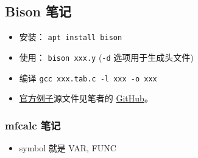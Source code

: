 \subsection{Bison 笔记}
\begin{itemize}
\item 安装： \verb`apt install bison`
\item 使用： \verb`bison xxx.y` (\verb`-d` 选项用于生成头文件)
\item 编译 \verb`gcc xxx.tab.c -l xxx -o xxx`
\item \href{http://web.mit.edu/gnu/doc/html/bison_5.html}{官方例子}源文件见笔者的 \href{https://github.com/MacroUniverse/bison_test}{GitHub}。
\end{itemize}

\subsubsection{mfcalc 笔记}
\begin{itemize}
\item symbol 就是 VAR, FUNC
\end{itemize}
